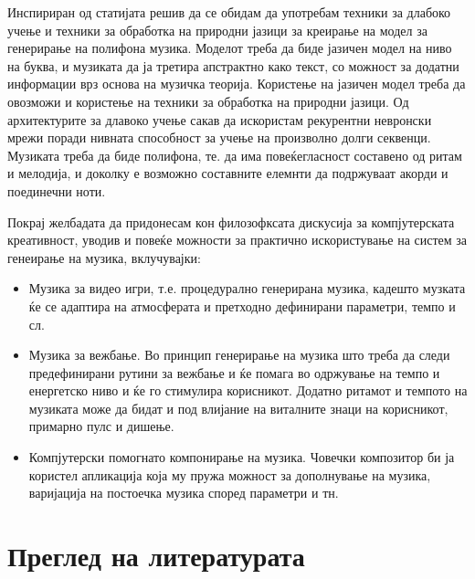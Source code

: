 Инспириран од статијата решив да се обидам да употребам техники за длабоко учење и техники за обработка на природни јазици за креирање на модел за генерирање на полифона музика. Моделот треба да биде јазичен модел на ниво на буква, и музиката да ја третира апстрактно како текст, со можност за додатни информации врз основа на музичка теорија. Користење на јазичен модел треба да овозможи и користење на техники за обработка на природни јазици. Од архитектурите за длавоко учење сакав да искористам рекурентни невронски мрежи поради нивната способност за учење на произволно долги секвенци. Музиката треба да биде полифона, те. да има повеќегласност составено од ритам и мелодија, и доколку е возможно составните елемнти да подржуваат акорди и поединечни ноти.

Покрај желбадата да придонесам кон филозофксата дискусија за компјутерската креативност, уводив и повеќе можности за практично искористување на систем за генеирање на музика, вклучувајки:
\begin{itemize}
\item Музика за видео игри, т.е. процедурално генерирана музика, кадешто музката ќе се адаптира на атмосферата и претходно дефинирани параметри, темпо и сл.
\item Музика за вежбање. Во принцип генерирање на музика што треба да следи предефинирани рутини за вежбање и ќе помага во одржување на темпо и енергетско ниво и ќе го стимулира корисникот. Додатно ритамот и темпото на музиката може да бидат и под влијание на виталните знаци на корисникот, примарно пулс и дишење.
\item Компјутерски помогнато компонирање на музика. Човечки композитор би ја користел апликација која му пружа можност за дополнување на музика, варијација на постоечка музика според параметри и тн.
\end{itemize}

\chapter{Преглед на литературата}
\label{ch:pregled}

